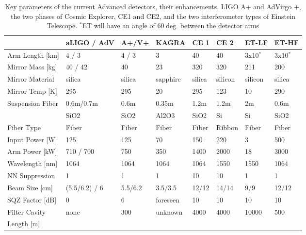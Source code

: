 \begin{table}[h]
\centering
\begin{tabular}{|l|l|l|p{1.6cm}|l|l|l|l|}
\hline
 &aLIGO / AdV &A+/V+ &KAGRA &CE 1 &CE 2 &ET-LF &ET-HF\\
\hline
Arm Length [km] & 4 / 3 &4 / 3& 3& 40& 40& 3x10$^*$ & 3x10$^*$\\
\hline
Mirror Mass [kg]& 40 / 42& 40& 23& 320& 320& 211& 200\\
\hline
Mirror Material& silica& silica& sapphire& silica& silicon& silicon& silica\\
\hline
Mirror Temp [K]& 295& 295& 20& 295& 123& 10& 290\\
\hline
Suspension Fiber& 0.6m/0.7m& 0.6m& 0.35m& 1.2m& 1.2m& 2m& 0.6m\\
& SiO2& SiO2&Al2O3&SiO2&Si&Si&SiO2\\
\hline
Fiber Type& Fiber& Fiber& Fiber& Fiber& Ribbon& Fiber& Fiber\\
\hline
Input Power [W]& 125& 125& 70& 150& 220& 3& 500\\
\hline
Arm Power [kW]& 710 / 700& 750& 350& 1400& 2000& 18& 3000\\
\hline
Wavelength [nm]& 1064& 1064& 1064& 1064& 1550& 1550& 1064\\
\hline
\acs{NN} Suppression& 1& 1& 1& 10& 10& 1& 1\\
\hline
Beam Size [cm]& (5.5/6.2) / 6& 5.5/6.2& 3.5/3.5& 12/12& 14/14& 9/9& 12/12\\
\hline
\acs{SQZ} Factor [dB]& 0& 6& foreseen& 10& 10& 10& 10\\
\hline
Filter Cavity & none& 300& unknown& 4000& 4000& 10000& 500\\
Length [m] &&&&&&&\\
\hline
\end{tabular}
\caption{Key parameters of the current Advanced detectors, their enhancements, LIGO A+ and AdVirgo +, the two phases of Cosmic Explorer, CE1 and CE2, and the two interferometer types of Einstein Telescope. $^*$\ac{ET} will have an angle of 60$\deg$ between the detector arms}
\label{Tab:FutIfos}
\end{table}

